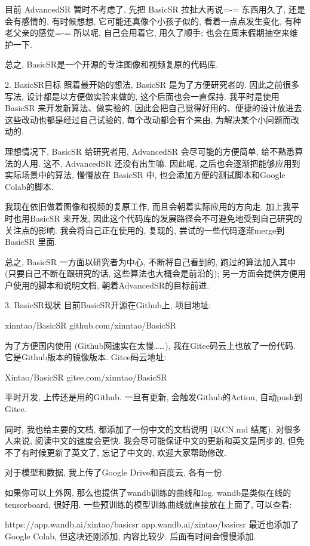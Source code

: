 \documentclass[../main.tex]{subfiles}
\begin{document}
目前 AdvancedSR 暂时不考虑了, 先把 BasicSR 拉扯大再说=-= 东西用久了, 还是会有感情的, 有时候想想, 它可能还真像个小孩子似的, 看着一点点发生变化, 有种老父亲的感觉=-= 所以呢, 自己会用着它, 用久了顺手; 也会在周末假期抽空来维护一下.

总之, BasicSR是一个开源的专注图像和视频复原的代码库.

2. BasicSR目标
照着最开始的想法, BasicSR 是为了方便研究者的. 因此之前很多写法, 设计都是以方便做实验来做的, 这个后面也会一直保持. 我平时是使用 BasicSR 来开发新算法、做实验的, 因此会把自己觉得好用的、便捷的设计放进去. 这些改动也都是经过自己试验的, 每个改动都会有个来由, 为解决某个小问题而改动的.

理想情况下, BasicSR 给研究者用, AdvancedSR 会尽可能的方便简单, 给不熟悉算法的人用. 这不, AdvancedSR 还没有出生嘛. 因此呢, 之后也会逐渐把能够应用到实际场景中的算法, 慢慢放在 BasicSR 中, 也会添加方便的测试脚本和Google Colab的脚本.

我现在依旧做着图像和视频的复原工作, 而且会朝着实际应用的方向走. 加上我平时也用BasicSR 来开发, 因此这个代码库的发展路径会不可避免地受到自己研究的关注点的影响. 我会将自己正在使用的, 复现的, 尝试的一些代码逐渐merge到 BasicSR 里面.

总之, BasicSR 一方面以研究者为中心, 不断将自己看到的, 跑过的算法加入其中 (只要自己不断在跟研究的话, 这些算法也大概会是前沿的); 另一方面会提供方便用户使用的脚本和说明文档, 朝着AdvancedSR的目标前进.

3. BasicSR现状
目前BasicSR开源在Github上, 项目地址:

xinntao/BasicSR
​github.com/xinntao/BasicSR

为了方便国内使用 (Github网速实在太慢……), 我在Gitee码云上也放了一份代码. 它是Github版本的镜像版本. Gitee码云地址:

Xintao/BasicSR
​gitee.com/xinntao/BasicSR

平时开发, 上传还是用的Github. 一旦有更新, 会触发Github的Action, 自动push到Gitee.

同时, 我也给主要的文档, 都添加了一份中文的文档说明 (以CN.md 结尾), 对很多人来说, 阅读中文的速度会更快. 我会尽可能保证中文的更新和英文是同步的, 但免不了有时候更新了英文了, 忘记了中文的, 欢迎大家帮助修改.

对于模型和数据, 我上传了Google Drive和百度云, 各有一份.

如果你可以上外网, 那么也提供了wandb训练的曲线和log. wandb是类似在线的tensorboard, 很好用. 一些预训练的模型训练曲线就直接放在上面了, 可以查看:

https://app.wandb.ai/xintao/basicsr
​app.wandb.ai/xintao/basicsr
最近也添加了Google Colab, 但这块还刚添加, 内容比较少. 后面有时间会慢慢添加.
\end{document}
